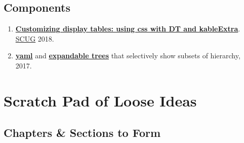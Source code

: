 \documentclass[
]{book}
\providecommand{\tightlist}{%
  \setlength{\itemsep}{0pt}\setlength{\parskip}{0pt}}
\begin{document}
\hypertarget{components}{%
\section{Components}\label{components}}

\begin{enumerate}
\def\labelenumi{\arabic{enumi}.}
\tightlist
\item
  \textbf{\href{https://raw.githack.com/OuhscBbmc/StatisticalComputing/master/2018-presentations/10-october/table-styling.html\#/}{Customizing display tables: using css with DT and kableExtra}}. \href{https://github.com/OuhscBbmc/StatisticalComputing}{SCUG} 2018.
\item
  \textbf{\href{https://github.com/wibeasley/class-yaml-2017/blob/master/data-public/raw/miechv-3-outcome-measure.yml}{yaml}} and \textbf{\href{https://rawcdn.githack.com/wibeasley/class-yaml-2017/55ad75a9f69b03fde929c06bb3ec129f25c816a9/analysis/miechv-3-measures/miechv-3-measures.html\#4_trees}{expandable trees}} that selectively show subsets of hierarchy, 2017.
\end{enumerate}

\hypertarget{scratch-pad}{%
\chapter{Scratch Pad of Loose Ideas}\label{scratch-pad}}

\hypertarget{chapters-sections-to-form}{%
\section{Chapters \& Sections to Form}\label{chapters-sections-to-form}}
\end{document}
